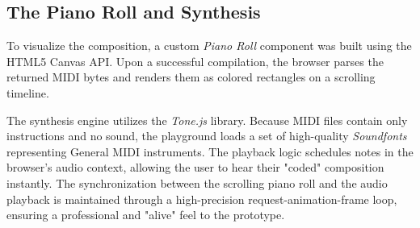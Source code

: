 \subsection{The Piano Roll and Synthesis}

To visualize the composition, a custom \textit{Piano Roll} component was built using the HTML5 Canvas API\@.
Upon a successful compilation, the browser parses the returned MIDI bytes and renders them as colored
rectangles on a scrolling timeline.

The synthesis engine utilizes the \textit{Tone.js} library.
Because MIDI files contain only instructions and no sound, the playground loads a set of high-quality
\textit{Soundfonts} representing General MIDI instruments.
The playback logic schedules notes in the browser's audio context, allowing the user to hear their "coded"
composition instantly.
The synchronization between the scrolling piano roll and the audio playback is maintained through a
high-precision request-animation-frame loop, ensuring a professional and "alive" feel to the prototype.
